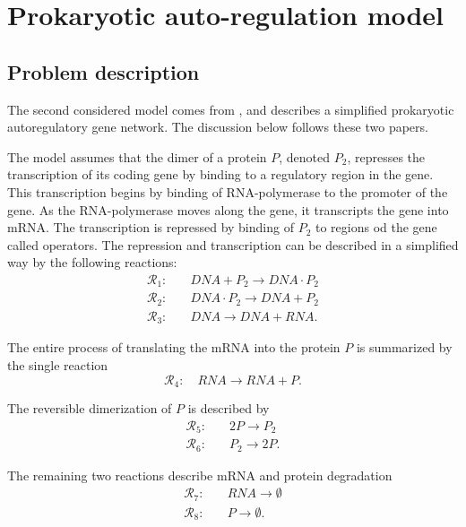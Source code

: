 \section{Prokaryotic auto-regulation model} \label{sec:autoregulation}
\subsection{Problem description}
The second considered model comes from \cite{wilkinson2, wilkinson}, and describes a simplified prokaryotic autoregulatory gene network. The discussion below follows these two papers.

The model assumes that the dimer of a protein $P$, denoted $P_2$, represses the transcription of its coding gene by binding to a regulatory region in the gene. This transcription begins by binding of RNA-polymerase to the promoter of the gene. As the RNA-polymerase moves along the gene, it transcripts the gene into mRNA. The transcription is repressed by binding of $P_2$ to regions od the gene called operators. The repression and transcription can be described in a simplified way by the following reactions:
\begin{equation*}
\begin{split}
\mathcal{R}_1:\quad & \mathit{DNA} + P_2 \to \mathit{DNA} \cdot P_2 \\
\mathcal{R}_2:\quad & \mathit{DNA} \cdot P_2 \to \mathit{DNA} + P_2 \\
\mathcal{R}_3:\quad & \mathit{DNA} \to \mathit{DNA} + \mathit{RNA}.
\end{split}
\end{equation*}

The entire process of translating the mRNA into the protein $P$ is summarized by the single reaction
\begin{equation*}
\mathcal{R}_4:\quad \mathit{RNA} \to \mathit{RNA} + P.
\end{equation*}

The reversible dimerization of $P$ is described by
\begin{equation*}
\begin{split}
\mathcal{R}_5:\quad & 2P \to P_2 \\
\mathcal{R}_6:\quad & P_2 \to 2P.
\end{split}
\end{equation*}

The remaining two reactions describe mRNA and protein degradation
\begin{equation*}
\begin{split}
\mathcal{R}_7:\quad & \mathit{RNA} \to \emptyset \\
\mathcal{R}_8:\quad & P \to \emptyset.
\end{split}
\end{equation*}

